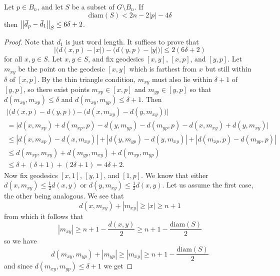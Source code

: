 \documentclass[10pt,a4paper]{amsart}
\newcommand{\od}{\mkern 3mu\overline{\mkern-3mu d\mkern 1.5mu}\mkern-1.5mu}
\begin{document}
\begin{lemma}\label{lem:DistanceFunctionNotChanging}
Let $p\in B_n$, and let $S$ be a subset of $G\setminus B_n$.  If
\[
\mathrm{diam}(S) < 2n-2|p|-4\delta
\]
then $\bigl\|\od_p-\od_{1}\bigr\|_S\leq 6\delta+2$.
\end{lemma}

\begin{proof}
Note that $d_1$ is just word length.  It suffices to prove that
\[
\bigl|\bigl( d(x,p) - |x|\bigr) - \bigl(d(y,p)-|y|\bigr)\bigr| \leq 2(6\delta+2)
\]
for all $x,y\in S$.  Let $x,y\in S$, and fix geodesics $[x,y]$, $[x,p]$, and $[y,p]$. Let $m_{xy}$ be the point on the geodesic $[x,y]$ which is farthest from $x$ but still within $\delta$ of $[x,p]$.  By the thin triangle condition, $m_{xy}$ must also lie within $\delta+1$ of $[y,p]$,
so there exist points $m_{xp}\in [x,p]$ and $m_{yp}\in [y,p]$ so that $d(m_{xy},m_{xp})\leq \delta$ and $d(m_{xy},m_{yp})\leq \delta+1$. Then
\begin{multline*}
\bigl|\bigl(d(x,p)-d(y,p)\bigr) - \bigl(d(x,m_{xy}) - d(y,m_{xy})\bigr)\bigr| \\
= \bigl|d(x,m_{xp}) + d(m_{xp},p) - d(y,m_{yp}) - d(m_{yp},p) - d(x,m_{xy}) + d(y,m_{xy})\bigr| \\
\leq |d(x,m_{xp})-d(x,m_{xy})| + |d(y,m_{yp})-d(y,m_{xy})| +|d(m_{xp},p)-d(m_{yp},p)| \\
\leq d(m_{xp},m_{xy}) + d(m_{yp},m_{xy}) + d(m_{xp},m_{yp}) \\ \leq \delta + (\delta+1) + (2\delta+1) = 4\delta+2.
\end{multline*}
Now fix geodesics $[x,1]$, $[y,1]$, and $[1,p]$.  We know that either $d(x,m_{xy}) \le \frac{1}{2} d(x,y)$ or $d(y,m_{xy}) \le \frac{1}{2}d(x,y)$. Let us assume the first case, the other being analogous. We see that
\[
d(x,m_{xy})+|m_{xy}| \ge |x| \ge n+1
\]
from which it follows that
\[
|m_{xy}| \geq n+1-\frac{d(x,y)}{2} \geq n+1 - \frac{\mathrm{diam}(S)}{2}
\]
so we have
\[
d(m_{xy},m_{yp})+|m_{yp}| \ge |m_{xy}| \ge n+1 - \frac{\mathrm{diam}(S)}{2}
\]
and since $d(m_{xy},m_{yp}) \le \delta+1$ we get


\end{proof}
\end{document}
